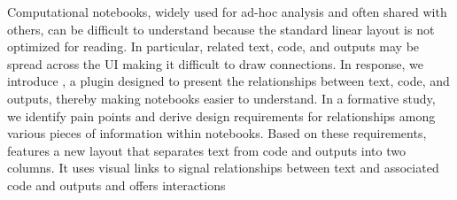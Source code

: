 
Computational notebooks, widely used for ad-hoc analysis and often shared with others, can be difficult to understand because the standard linear layout is not optimized for reading.
In particular, related text, code, and outputs may be spread across the UI making it difficult to draw connections.
In response, we introduce \tool, a plugin designed to present the relationships between text, code, and outputs, thereby making notebooks easier to understand.
In a formative study, we identify pain points and derive design requirements for  relationships among various pieces of information within notebooks.
Based on these requirements, \tool features a new layout that separates text from code and outputs into two columns.
It uses visual links to signal relationships between text and associated code and outputs and offers interactions 
